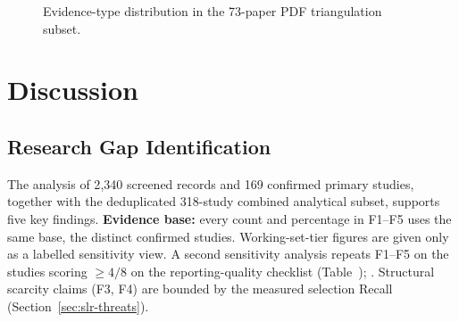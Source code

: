 \begin{figure}[tbp]
\centering
{}
\caption{Evidence-type distribution in the 73-paper PDF triangulation subset.}
\label{fig:pdf-evidence-dist}
\end{figure}


\section{Discussion}
\label{sec:slr-discussion}

\subsection{Research Gap Identification}
\label{sec:slr-gaps}

The analysis of 2{,}340 screened records and 169 confirmed primary studies,
together with the deduplicated 318-study combined analytical subset, supports
five key findings. \textbf{Evidence base:} every count and percentage in
F1--F5 uses the same base, the  distinct confirmed studies.
Working-set-tier figures are given only as a labelled sensitivity view. A
second sensitivity analysis repeats F1--F5 on the  studies scoring
$\geq 4/8$ on the reporting-quality checklist (Table~); . Structural scarcity claims (F3,
F4) are bounded by the measured selection Recall
(Section~\ref{sec:slr-threats}).

